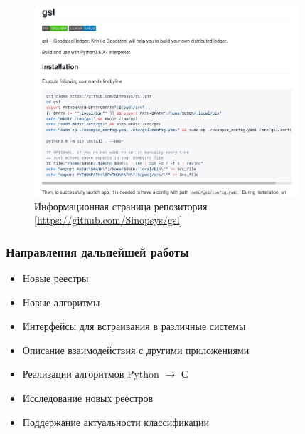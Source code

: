 \documentclass{beamer}
\begin{document}
\begin{frame}
    \begin{figure}
        \centering
        \includegraphics[width=0.88\textwidth]{repo_small}
        \caption{\centering \small Информационная страница репозитория [\url{https://github.com/Sinopsys/gsl}]}
    \end{figure}
\end{frame}

\begin{frame}
    \frametitle{Направления дальнейшей работы}
    \begin{itemize}
        \item Новые реестры
        \item Новые алгоритмы
        \item Интерфейсы для встраивания в различные системы
        \item Описание взаимодействия с другими приложениями
        \item Реализации алгоритмов Python $\rightarrow$ С
        \item Исследование новых реестров
        \item Поддержание актуальности классификации
    \end{itemize}
\end{frame}
\end{document}
